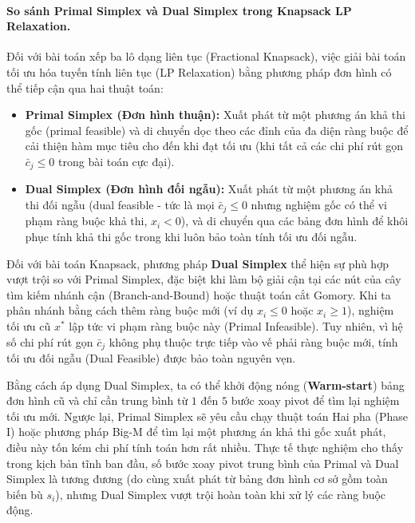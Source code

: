 \documentclass[fontsize=13pt,a4paper]{report}
\begin{document}
\paragraph{So sánh Primal Simplex và Dual Simplex trong Knapsack LP Relaxation.}
Đối với bài toán xếp ba lô dạng liên tục (Fractional Knapsack), việc giải bài toán tối ưu hóa tuyến tính liên tục (LP Relaxation) bằng phương pháp đơn hình có thể tiếp cận qua hai thuật toán:
\begin{itemize}[leftmargin=*]
    \item \textbf{Primal Simplex (Đơn hình thuận):} Xuất phát từ một phương án khả thi gốc (primal feasible) và di chuyển dọc theo các đỉnh của đa diện ràng buộc để cải thiện hàm mục tiêu cho đến khi đạt tối ưu (khi tất cả các chi phí rút gọn $\bar{c}_j \le 0$ trong bài toán cực đại).
    \item \textbf{Dual Simplex (Đơn hình đối ngẫu):} Xuất phát từ một phương án khả thi đối ngẫu (dual feasible - tức là mọi $\bar{c}_j \le 0$ nhưng nghiệm gốc có thể vi phạm ràng buộc khả thi, $x_i < 0$), và di chuyển qua các bảng đơn hình để khôi phục tính khả thi gốc trong khi luôn bảo toàn tính tối ưu đối ngẫu.
\end{itemize}
Đối với bài toán Knapsack, phương pháp \textbf{Dual Simplex} thể hiện sự phù hợp vượt trội so với Primal Simplex, đặc biệt khi làm bộ giải cận tại các nút của cây tìm kiếm nhánh cận (Branch-and-Bound) hoặc thuật toán cắt Gomory. Khi ta phân nhánh bằng cách thêm ràng buộc mới (ví dụ $x_i \le 0$ hoặc $x_i \ge 1$), nghiệm tối ưu cũ $x^*$ lập tức vi phạm ràng buộc này (Primal Infeasible). Tuy nhiên, vì hệ số chi phí rút gọn $\bar{c}_j$ không phụ thuộc trực tiếp vào vế phải ràng buộc mới, tính tối ưu đối ngẫu (Dual Feasible) được bảo toàn nguyên vẹn. 

Bằng cách áp dụng Dual Simplex, ta có thể khởi động nóng (\textbf{Warm-start}) bảng đơn hình cũ và chỉ cần trung bình từ $1$ đến $5$ bước xoay pivot để tìm lại nghiệm tối ưu mới. Ngược lại, Primal Simplex sẽ yêu cầu chạy thuật toán Hai pha (Phase I) hoặc phương pháp Big-M để tìm lại một phương án khả thi gốc xuất phát, điều này tốn kém chi phí tính toán hơn rất nhiều. Thực tế thực nghiệm cho thấy trong kịch bản tĩnh ban đầu, số bước xoay pivot trung bình của Primal và Dual Simplex là tương đương (do cùng xuất phát từ bảng đơn hình cơ sở gồm toàn biến bù $s_i$), nhưng Dual Simplex vượt trội hoàn toàn khi xử lý các ràng buộc động.
\end{document}
